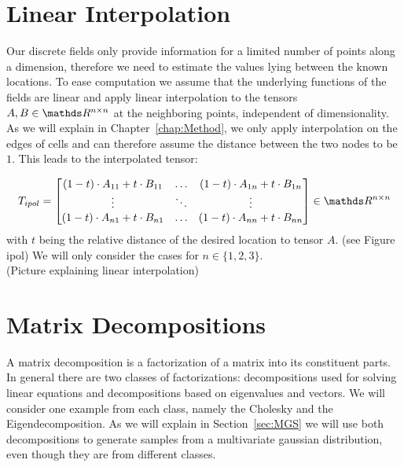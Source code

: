 \section{Linear Interpolation}

Our discrete fields only provide information for a limited number of
points along a dimension, therefore we need to estimate the values lying
between the known locations. To ease computation we assume that the
underlying functions of the fields are linear and apply linear
interpolation to the tensors $A, B \in \real^{n \times n}$ at the
neighboring points, independent of dimensionality. As we will explain in
Chapter~\ref{chap:Method}, we only apply interpolation on the edges of
cells and can therefore assume the distance between the two nodes to be
$1$. This leads to the interpolated tensor:

\begin{equation}
  T_{ipol} =
  \begin{bmatrix}
    (1-t) \cdot A_{11} + t \cdot B_{11} & \dots & (1-t) \cdot A_{1n} + t \cdot B_{1n} \\
    \vdots & \ddots & \vdots \\
    (1-t) \cdot A_{n1} + t \cdot B_{n1} & \dots & (1-t) \cdot A_{nn} + t \cdot B_{nn} \\
  \end{bmatrix}
  \in \real^{n \times n}
\end{equation}
with $t$ being the relative distance of the desired location to tensor
$A$. (see Figure ipol) We will only consider the cases for $n \in
\{1,2,3\}$. \\
(Picture explaining linear interpolation)

\section{Matrix Decompositions}

A matrix decomposition is a factorization of a matrix into its
constituent parts. In general there are two classes of factorizations:
decompositions used for solving linear equations and decompositions
based on eigenvalues and vectors. We will consider one example from each
class, namely the Cholesky and the Eigendecomposition. As we will
explain in Section~\ref{sec:MGS} we will use both decompositions to
generate samples from a multivariate gaussian distribution, even though
they are from different classes.

